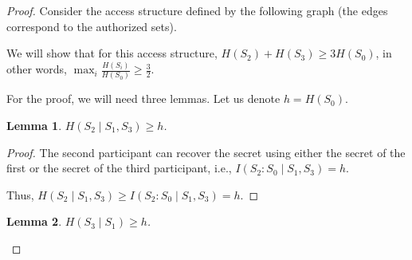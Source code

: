 \documentclass[12pt,sans]{article}
\theoremstyle{definition}
\theoremstyle{plain}
\newtheorem{lemma}{Lemma}[section]
\theoremstyle{remark}
\begin{document}
\begin{proof}
    Consider the access structure defined by the following graph (the edges correspond to the authorized
    sets).
    \begin{center}
    \end{center}
    We will show that for this access structure, $H(S_2) + H(S_3) \ge 3H(S_0)$, in other words,
    $\max_i \frac{H(S_i)}{H(S_0)} \ge \frac{3}{2}$.

    For the proof, we will need three lemmas. Let us denote $h = H(S_0)$.

    \begin{lemma}
        $H(S_2 \mid S_1, S_3) \ge h$.
    \end{lemma}

    \begin{proof}
        The second participant can recover the secret using either the secret of the first or the secret of the third participant,
        i.e., $I(S_2 : S_0 \mid S_1, S_3) = h$.
        \begin{center}
        \end{center}
        Thus, $H(S_2 \mid S_1, S_3) \ge I(S_2 : S_0 \mid S_1, S_3) = h$.
    \end{proof}

    \begin{lemma}
        $H(S_3 \mid S_1) \ge h$.
    \end{lemma}


\end{proof}
\end{document}
